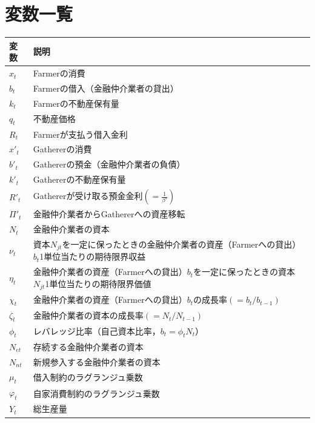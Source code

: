 \documentclass[dvipdfmx]{jlreq}
\begin{document}

\section*{変数一覧}

\begin{table}[H]
\centering
\begin{tabular}{ll}
\hline
変数 & 説明 \\
\hline
$x_t$ & Farmerの消費 \\
$b_t$ & Farmerの借入（金融仲介業者の貸出） \\
$k_t$ & Farmerの不動産保有量 \\
$q_t$ & 不動産価格 \\
$R_t$ & Farmerが支払う借入金利 \\[1mm]

$x'_t$ & Gathererの消費 \\
$b'_t$ & Gathererの預金（金融仲介業者の負債） \\
$k'_t$ & Gathererの不動産保有量 \\
$R'_t$ & Gathererが受け取る預金金利$(=\frac{1}{\beta'})$ \\
$\Pi'_t$ & 金融仲介業者からGathererへの資産移転 \\[1mm]

$N_t$ & 金融仲介業者の資本 \\
$\nu_t$ & 資本$N_{jt}$を一定に保ったときの金融仲介業者の資産（Farmerへの貸出）$b_t$1単位当たりの期待限界収益 \\
$\eta_t$ & 金融仲介業者の資産（Farmerへの貸出）$b_t$を一定に保ったときの資本$N_{jt}$1単位当たりの期待限界価値 \\
$\chi_t$ & 金融仲介業者の資産（Farmerへの貸出）$b_t$の成長率$(=b_t/b_{t-1})$ \\
$\zeta_t$ & 金融仲介業者の資本の成長率$(=N_t/N_{t-1})$ \\
$\phi_t$ & レバレッジ比率（自己資本比率，$b_t=\phi_tN_t$） \\
$N_{et}$ & 存続する金融仲介業者の資本 \\
$N_{nt}$ & 新規参入する金融仲介業者の資本 \\[1mm]

$\mu_t$ & 借入制約のラグランジュ乗数 \\
$\varphi_t$ & 自家消費制約のラグランジュ乗数 \\[1mm]

$Y_t$ & 総生産量 \\
\hline
\end{tabular}
\end{table}
\end{document}
